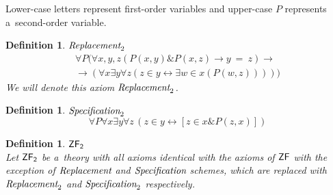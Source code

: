 \documentclass[12pt,a4paper]{article}
\newtheorem{definition}[theorem]{Definition}
\renewcommand{\iff}{\leftrightarrow}
\newcommand{\then}{\rightarrow}
\begin{document}
\begin{}

Lower-case letters represent first-order variables and upper-case $P$ represents a~second-order variable. \cite{Shapiro87}
\begin{definition}{$\emph{Replacement}_2$}\label{def:replacement_2}\\
\begin{equation}
\begin{gathered}
\forall P (\forall x, y, z (P(x, y) \& P(x, z) \then y\ =\ z) \then
\\
\then (\forall x \exists y \forall z (z \in y \iff \exists w \in x (P(w, z)))))
\end{gathered}
\end{equation}
We will denote this axiom $\emph{Replacement}_2$.
\end{definition}

\begin{definition}{$\emph{Specification}_2$}\\
\begin{equation}
\forall P \forall x \exists y \forall z \, ( z \in y \iff [ z \in x \& P(z, x) ] )
\end{equation}
\end{definition}

\begin{definition}{$\sf{ZF}_2$}\\
Let $\sf{ZF}_2$ be a~theory with all axioms identical with the axioms of $\sf{ZF}$ with the exception of $\emph{Replacement}$ and $\emph{Specification}$ schemes, which are replaced with $\emph{Replacement}_2$ and $\emph{Specification}_2$ respectively.
\end{definition}





\end{}
\end{document}
